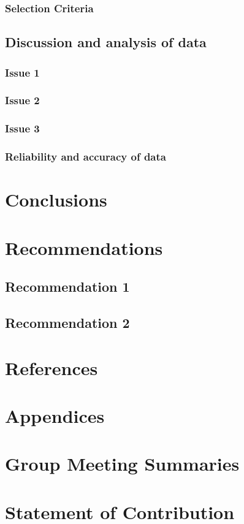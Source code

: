 \documentclass[12pt, letterpaper, twoside]{article}
\begin{document}
\subsubsection{Selection Criteria}

\subsection{Discussion and analysis of data}

\subsubsection{Issue 1}

\subsubsection{Issue 2}

\subsubsection{Issue 3}

\subsubsection{Reliability and accuracy of data}

\section{Conclusions}

\section{Recommendations}

\subsection{Recommendation 1}

\subsection{Recommendation 2}

\section{References}

\section{Appendices}

\section{Group Meeting Summaries}

\section{Statement of Contribution}
 
\end{document}
